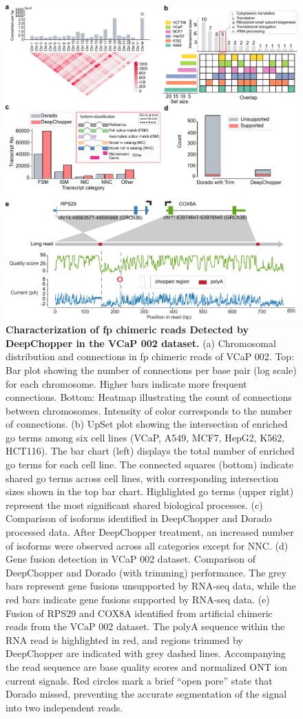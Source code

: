 \documentclass[pdflatex,sn-nature, lineno]{sn-jnl}%
\theoremstyle{thmstyleone}%
\theoremstyle{thmstyletwo}%
\theoremstyle{thmstylethree}%
\begin{document}
\begin{figure}[H]
	\includegraphics[height=1\columnwidth]{finals/figure2}
	\caption{{\bf Characterization of \gls{fp} chimeric reads Detected by DeepChopper in the VCaP 002 dataset.} (a) Chromosomal distribution and connections in \gls{fp} chimeric reads of VCaP 002. Top: Bar plot showing the number of connections per base pair (log scale) for each chromosome. Higher bars indicate more frequent connections. Bottom: Heatmap illustrating the count of connections between chromosomes. Intensity of color corresponds to the number of connections. (b) UpSet plot showing the intersection of enriched \gls{go} terms among six cell lines (VCaP, A549, MCF7, HepG2, K562, HCT116). The bar chart (left) displays the total number of enriched \gls{go} terms for each cell line. The connected squares (bottom) indicate shared \gls{go} terms across cell lines, with corresponding intersection sizes shown in the top bar chart. Highlighted \gls{go} terms (upper right) represent the most significant shared biological processes. (c) Comparison of isoforms identified in DeepChopper and Dorado processed data. After DeepChopper treatment, an increased number of isoforms were observed across all categories except for NNC. (d) Gene fusion detection in VCaP 002 dataset. Comparison of DeepChopper and Dorado (with trimming) performance. The grey bars represent gene fusions unsupported by RNA-seq data, while the red bars indicate gene fusions supported by RNA-seq data. (e) Fusion of RPS29 and COX8A identified from artificial chimeric reads from the VCaP 002 dataset. The polyA sequence within the RNA read is highlighted in red, and regions trimmed by DeepChopper are indicated with grey dashed lines. Accompanying the read sequence are base quality scores and normalized ONT ion current signals. Red circles mark a brief ``open pore'' state that Dorado missed, preventing the accurate segmentation of the signal into two independent reads.}\label{fig:f2}
\end{figure}
\end{document}
